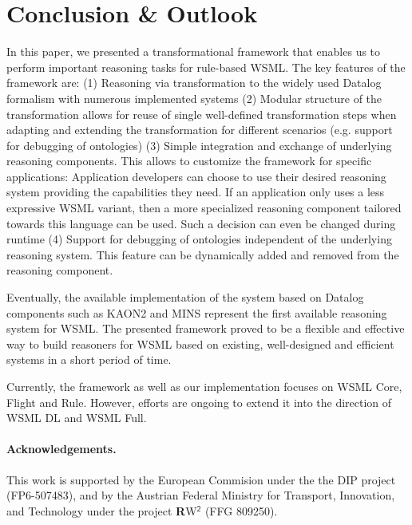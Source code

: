\section{Conclusion \& Outlook\label{sec:outlook}}
In this paper, we presented a transformational framework that
enables us to perform important reasoning tasks for rule-based
WSML. The key features of the framework are: (1) Reasoning via
transformation to the widely used Datalog formalism with numerous
implemented systems (2) Modular structure of the transformation
allows for reuse of single well-defined transformation steps when
adapting and extending the transformation for different scenarios
(e.g. support for debugging of ontologies) (3) Simple integration
and exchange of underlying reasoning components. This allows to
customize the framework for specific applications: Application
developers can choose to use their desired reasoning system
providing the capabilities they need. If an application only uses
a less expressive WSML variant, then a more specialized reasoning
component tailored towards this language can be used. Such a
decision can even be changed during runtime (4) Support for
debugging of ontologies independent of the underlying reasoning
system. This feature can be dynamically added and removed from the
reasoning component.

 Eventually, the available implementation of the
system based on Datalog components such as KAON2 and MINS
represent the first available reasoning system for WSML. The
presented framework proved to be a flexible and effective way to
build reasoners for WSML based on existing, well-designed and
efficient systems in a short period of time.

Currently, the framework as well as our implementation focuses on
WSML Core, Flight and Rule. However, efforts are ongoing to extend
it into the direction of WSML DL and WSML Full.
%
%
%
%
%
%


\paragraph{Acknowledgements.}
This work is supported by the European Commision under the the DIP
project (FP6-507483), and by the Austrian Federal Ministry for
Transport, Innovation, and Technology under the project {\sffamily
 {\bfseries R}W$^{\mathsf{2}}$} (FFG 809250).
